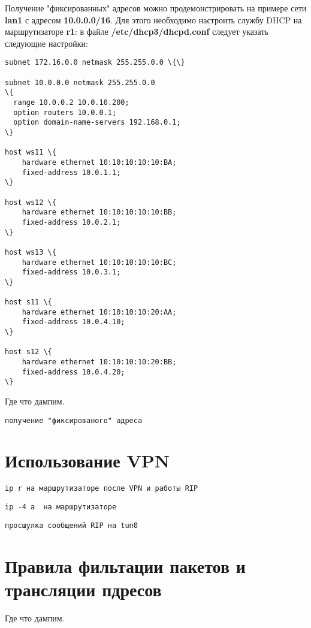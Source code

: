 \documentclass[a4paper,12pt]{article}
\begin{document}
Получение "фиксированных" адресов можно продемонстрировать на
примере сети \textbf{lan1} с адресом \textbf{10.0.0.0/16}. Для
этого необходимо настроить службу DHCP на маршрутизаторе
\textbf{r1}: в файле \textbf{/etc/dhcp3/dhcpd.conf} следует
указать следующие настройки:
\begin{Verbatim}
subnet 172.16.0.0 netmask 255.255.0.0 \{\}

subnet 10.0.0.0 netmask 255.255.0.0
\{
  range 10.0.0.2 10.0.10.200;
  option routers 10.0.0.1;
  option domain-name-servers 192.168.0.1;
\}

host ws11 \{
    hardware ethernet 10:10:10:10:10:BA;
    fixed-address 10.0.1.1;
\}

host ws12 \{
    hardware ethernet 10:10:10:10:10:BB;
    fixed-address 10.0.2.1;
\}

host ws13 \{
    hardware ethernet 10:10:10:10:10:BC;
    fixed-address 10.0.3.1;
\}

host s11 \{
    hardware ethernet 10:10:10:10:20:AA;
    fixed-address 10.0.4.10;
\}

host s12 \{
    hardware ethernet 10:10:10:10:20:BB;
    fixed-address 10.0.4.20;
\}
\end{Verbatim}

Где что дампим.

\begin{Verbatim}
получение "фиксированого" адреса
\end{Verbatim}


\section{Использование VPN}

\begin{Verbatim}
ip r на маршрутизаторе после VPN и работы RIP
\end{Verbatim}

\begin{Verbatim}
ip -4 a  на маршрутизаторе
\end{Verbatim}

\begin{Verbatim}
просшулка сообщений RIP на tun0
\end{Verbatim}


\section{Правила фильтации пакетов и трансляции пдресов}

Где что дампим.
\end{document}
